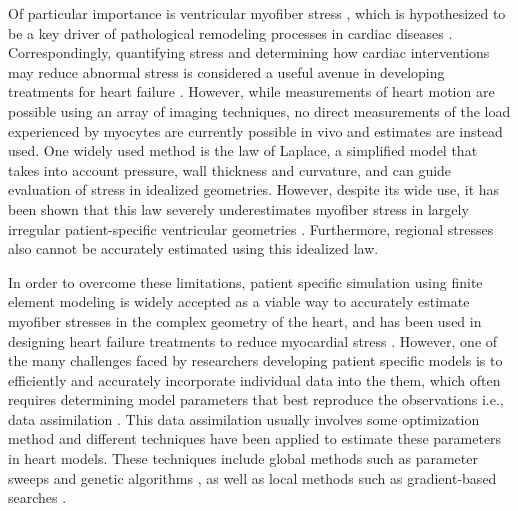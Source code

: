 Of particular importance is ventricular myofiber stress
\citep{yin1981ventricular}, which is hypothesized to be a key driver of
pathological remodeling processes in cardiac diseases
\citep{grossman1975wall}. Correspondingly, quantifying stress and determining how cardiac interventions may reduce abnormal stress is
considered a useful avenue in developing treatments for heart failure
\citep{guccione2003myosplint}. However, while measurements of heart motion
are possible using an array of imaging techniques, no direct measurements 
of the load experienced by myocytes are currently possible in vivo and 
estimates are instead used.  One widely used method is the law of Laplace, a
simplified model that takes into account pressure, wall thickness and curvature, and can guide
evaluation of stress in idealized geometries.   However, despite its wide use, it has been shown that this law severely underestimates
myofiber stress in largely irregular patient-specific ventricular geometries 
 \citep{zhang2011comparison}. Furthermore, regional stresses also
cannot be accurately estimated using this idealized law. 

In order to overcome these limitations, patient specific simulation using finite element modeling is
widely accepted as a viable way to accurately estimate myofiber
stresses in the complex geometry of the heart, and has been used in designing heart
failure treatments to reduce myocardial stress \citep{lee2013algisyl, guccione2003myosplint, Wall2006}. However, one of the many challenges faced by researchers developing patient specific models is to
efficiently and accurately incorporate individual data into the them, which often
requires determining model parameters that best reproduce the
observations i.e., data assimilation
\citep{sermesant2006cardiac,chapelle2013fundamental}.  This data assimilation usually involves
some optimization method and different techniques have been
applied to estimate these parameters in heart models. These techniques include global
methods such as parameter sweeps
\citep{asner2015estimation,Genet2015JBE} and genetic algorithms
\citep{nair2007optimizing}, as well as local methods such as gradient-based
searches \citep{balaban}.

